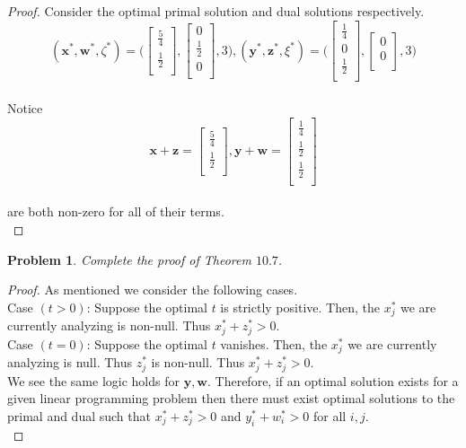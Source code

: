 \documentclass[12pt,oneside]{amsart}
\numberwithin{equation}{section}
\numberwithin{figure}{section}
\theoremstyle{plain}
\newtheorem{prob}{Problem}
\theoremstyle{definition}
\begin{document}
\begin{proof}
Consider the optimal primal solution and dual solutions respectively. \\
\[(\mathbf{x}^*,\mathbf{w}^*,\zeta^*) = \Bigg(\begin{bmatrix}
  \frac{5}{4} \\
  \frac{1}{2} \\
\end{bmatrix},\begin{bmatrix}
  0           \\
  \frac{1}{2} \\
  0           \\
\end{bmatrix},3\Bigg),(\mathbf{y}^*,\mathbf{z}^*,\xi^*) = \Bigg(\begin{bmatrix}
  \frac{1}{4} \\
  0           \\
  \frac{1}{2} \\
\end{bmatrix},\begin{bmatrix}
  0 \\
  0 \\
\end{bmatrix},3\Bigg)\] \\
Notice \\
\[\mathbf{x} + \mathbf{z} = \begin{bmatrix}
  \frac{5}{4} \\
  \frac{1}{2} \\
\end{bmatrix},\mathbf{y} + \mathbf{w} = \begin{bmatrix}
  \frac{1}{4} \\
  \frac{1}{2} \\
  \frac{1}{2} \\
\end{bmatrix}\] \\
are both non-zero for all of their terms. \\
\end{proof}

\begin{prob}
Complete the proof of Theorem $10.7$. \\
\end{prob}
\begin{proof}
As mentioned we consider the following cases. \\
Case $(t > 0)$: Suppose the optimal $t$ is strictly positive. Then, the $x^*_j$ 
we are currently analyzing is non-null. Thus $x^*_j + z^*_j > 0$. \\
Case $(t = 0)$: Suppose the optimal $t$ vanishes. Then, the $x^*_j$ we are 
currently analyzing is null. Thus $z^*_j$ is non-null. Thus $x^*_j + z^*_j > 0$. \\
We see the same logic holds for $\mathbf{y},\mathbf{w}$. Therefore, if an optimal 
solution exists for a given linear programming problem then there must exist 
optimal solutions to the primal and dual such that $x^*_j + z^*_j > 0$ and $y^*_i 
+ w^*_i > 0$ for all $i,j$. \\
\end{proof}
\end{document}
